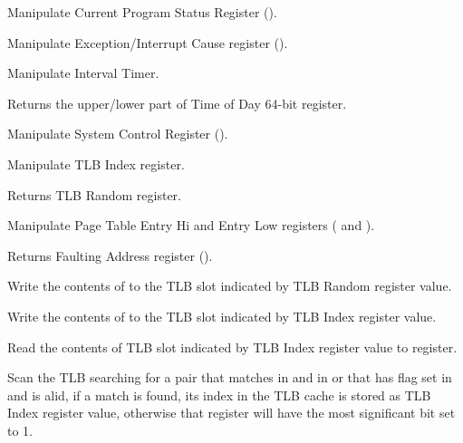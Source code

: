 
Manipulate Current Program Status Register ().


Manipulate Exception/Interrupt Cause register ().


Manipulate Interval Timer.


Returns the upper/lower part of Time of Day 64-bit register.


Manipulate System Control Register ().


Manipulate TLB Index register.


Returns TLB Random register.


Manipulate Page Table Entry Hi and Entry Low registers ( and ).


Returns Faulting Address register ().


Write the contents of  to the TLB slot indicated by TLB Random register value.


Write the contents of  to the TLB slot indicated by TLB Index register value.


Read the contents of TLB slot indicated by TLB Index register value to  register.


Scan the TLB searching for a pair that matches  in and  in  or that has  flag set in  and is alid, if a match is found, its index in the TLB cache is stored as TLB Index register value, otherwise that register will have the most significant bit set to 1.

